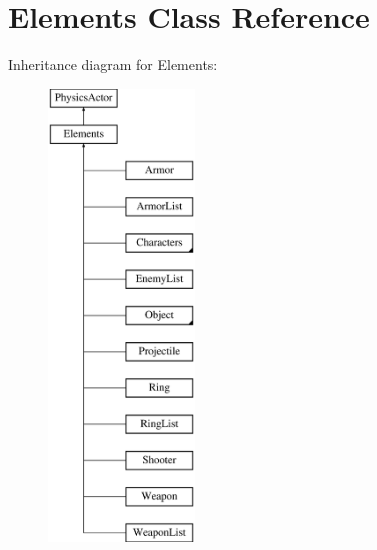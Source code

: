 \hypertarget{class_elements}{\section{Elements Class Reference}
\label{class_elements}
}
Inheritance diagram for Elements\+:\begin{figure}[H]
\begin{center}
\leavevmode
\includegraphics[height=12.000000cm]{class_elements}
\end{center}
\end{figure}
